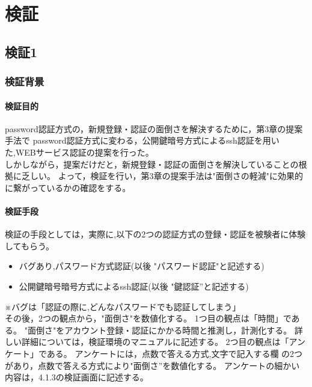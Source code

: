 \chapter{検証}
\label{chap:poordirection}


\section{検証1}

\subsection{検証背景}

\subsubsection{検証目的}

password認証方式の，新規登録・認証の面倒さを解決するために，第3章の提案手法で
password認証方式に変わる，公開鍵暗号方式によるssh認証を用いた,WEBサービス認証の提案を行った。\\
しかしながら，提案だけだと，新規登録・認証の面倒さを解決していることの根拠に乏しい。
よって，検証を行い，第3章の提案手法は"面倒さの軽減"に効果的に繋がっているかの確認をする。


\subsubsection{検証手段}

検証の手段としては，実際に,以下の2つの認証方式の登録・認証を被験者に体験してもらう。

\begin{itemize}
  \item バグあり,パスワード方式認証(以後 "パスワード認証"と記述する)
  \item 公開鍵暗号暗号方式によるssh認証(以後 "鍵認証”と記述する)
\end{itemize}

※バグは「認証の際に,どんなパスワードでも認証してしまう」\\
その後，2つの観点から，"面倒さ"を数値化する。
1つ目の観点は「時間」である。
"面倒さ"をアカウント登録・認証にかかる時間と推測し，計測化する。
詳しい詳細については，検証環境のマニュアルに記述する。
2つ目の観点は「アンケート」である。
アンケートには，点数で答える方式,文字で記入する欄 の2つがあり，点数で答える方式により"面倒さ”を数値化する。
アンケートの細かい内容は，4.1.3の検証画面に記述する。

